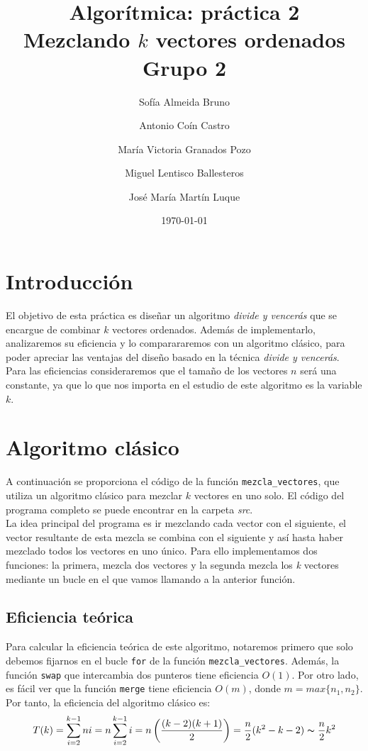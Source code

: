 \documentclass[11pt]{article}
\title{Algorítmica: práctica 2 \\ \large Mezclando $k$ vectores ordenados\\ \vspace{0.2em}Grupo 2}
\author{Sofía Almeida Bruno \and Antonio Coín Castro \and María Victoria Granados Pozo \and Miguel Lentisco Ballesteros \and José María Martín Luque}
\date{\today}
\begin{document}
\maketitle

\newpage

\section*{Introducción}

El objetivo de esta práctica es diseñar un algoritmo \textit{divide y vencerás}
que se encargue de combinar $k$ vectores ordenados. Además de implementarlo, analizaremos su eficiencia y lo comparararemos con un algoritmo clásico, para poder apreciar las ventajas del diseño basado en la técnica \textit{divide y vencerás}. Para las eficiencias consideraremos que el tamaño de los vectores $n$ será una constante, ya que lo que nos importa en el estudio de este algoritmo es la variable $k$.

\section*{Algoritmo clásico}

A continuación se proporciona el código de la función \texttt{mezcla\_vectores},
que utiliza un algoritmo clásico para mezclar $k$ vectores en uno solo. El
código del programa completo se puede encontrar en la carpeta \textit{src}.\\
La idea principal del programa es ir mezclando cada vector con el siguiente, el vector resultante de esta mezcla se combina con el siguiente y así hasta haber mezclado todos los vectores en uno único. Para ello implementamos dos funciones: la primera, mezcla dos vectores y la segunda mezcla los \textit{k} vectores mediante un bucle en el que vamos llamando a la anterior función.\\


\subsection*{Eficiencia teórica}

Para calcular la eficiencia teórica de este algoritmo, notaremos primero que solo debemos fijarnos en el bucle \verb|for| de la función \verb|mezcla_vectores|. Además, la función \verb|swap| que intercambia dos punteros tiene eficiencia $O(1)$. Por otro lado, es fácil ver que la función \verb|merge| tiene eficiencia $O(m)$, donde $m = max\{n_1, n_2\}$. Por tanto, la eficiencia del algoritmo clásico es: $$T(k) = \sum_{i=2}^{k-1} ni = n \sum_{i=2}^{k-1} i = n \left( \frac{(k-2)(k+1)}{2} \right) = \frac{n}{2}(k^2 -k - 2) \thicksim \frac{n}{2}k^2$$
\end{document}
